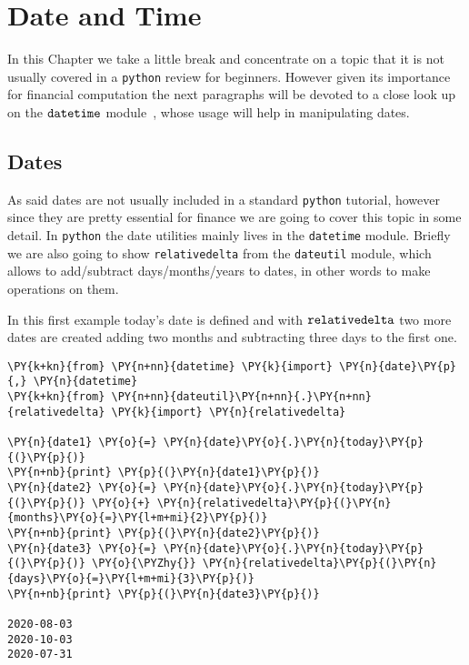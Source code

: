 \chapter{Date and Time}
\label{sec:datetime}

In this Chapter we take a little break and concentrate on a topic that it is not usually covered 
in a \texttt{python} review for beginners. However given its importance for financial computation 
the next paragraphs will be devoted to a close look up on the $\tt{datetime}$ module~\cite{bib:datetime}, whose usage 
will help in manipulating dates.

\section{Dates}\label{dates}

As said dates are not usually included in a standard \texttt{python} tutorial, however since they 
are pretty essential for finance we are going to cover this topic in some detail. 
In \texttt{python} the date utilities mainly lives in the \texttt{datetime} module. Briefly we are 
also going to show \texttt{relativedelta} from the \texttt{dateutil} module, which allows to 
add/subtract days/months/years to dates, in other words to make operations on them.

In this first example today's date is defined and with $\tt{relativedelta}$ two more dates are created 
adding two months and subtracting three days to the first one.

\begin{tcolorbox}[breakable, size=fbox, boxrule=1pt, pad at break*=1mm,colback=cellbackground, colframe=cellborder]
\begin{Verbatim}[commandchars=\\\{\}]
\PY{k+kn}{from} \PY{n+nn}{datetime} \PY{k}{import} \PY{n}{date}\PY{p}{,} \PY{n}{datetime}
\PY{k+kn}{from} \PY{n+nn}{dateutil}\PY{n+nn}{.}\PY{n+nn}{relativedelta} \PY{k}{import} \PY{n}{relativedelta}

\PY{n}{date1} \PY{o}{=} \PY{n}{date}\PY{o}{.}\PY{n}{today}\PY{p}{(}\PY{p}{)}
\PY{n+nb}{print} \PY{p}{(}\PY{n}{date1}\PY{p}{)}
\PY{n}{date2} \PY{o}{=} \PY{n}{date}\PY{o}{.}\PY{n}{today}\PY{p}{(}\PY{p}{)} \PY{o}{+} \PY{n}{relativedelta}\PY{p}{(}\PY{n}{months}\PY{o}{=}\PY{l+m+mi}{2}\PY{p}{)}
\PY{n+nb}{print} \PY{p}{(}\PY{n}{date2}\PY{p}{)}
\PY{n}{date3} \PY{o}{=} \PY{n}{date}\PY{o}{.}\PY{n}{today}\PY{p}{(}\PY{p}{)} \PY{o}{\PYZhy{}} \PY{n}{relativedelta}\PY{p}{(}\PY{n}{days}\PY{o}{=}\PY{l+m+mi}{3}\PY{p}{)}
\PY{n+nb}{print} \PY{p}{(}\PY{n}{date3}\PY{p}{)}

2020-08-03
2020-10-03
2020-07-31
\end{Verbatim}
\end{tcolorbox}

